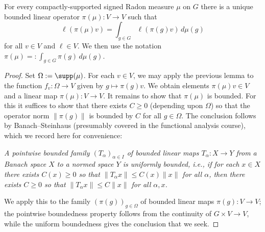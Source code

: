\documentclass[reqno]{amsart} 
\begin{document}
\begin{lemma}
  For every compactly-supported signed Radon measure $\mu$ on $G$ there is a unique bounded linear operator $\pi(\mu) : V \rightarrow V$ such that
  \begin{equation}\label{eq:}
    \ell(\pi(\mu) v)
    = \int_{g \in G} \ell(\pi(g) v) \, d \mu(g)
  \end{equation}
  for all $v \in V$ and $\ell \in V$.  We then use the notation $\pi(\mu) =: \int_{g \in G} \pi(g) \, d \mu(g)$.
\end{lemma}
\begin{proof}
  Set $\Omega := \supp(\mu)$.  For each $v \in V$, we may apply the previous lemma to the function $f_v : \Omega \rightarrow V$ given by $g \mapsto \pi(g) v$.  We obtain elements $\pi(\mu) v \in V$ and a linear map $\pi(\mu) : V \rightarrow V$.  It remains to show that $\pi(\mu)$ is bounded.  For this it suffices to show that there exists $C \geq 0$ (depending upon $\Omega$) so that the operator norm $\|\pi(g)\|$ is bounded by $C$ for all $g \in \Omega$.  The conclusion follows by Banach--Steinhaus (presumably covered in the functional analysis course), which we record here for convenience:
  \begin{center}
    \emph{A pointwise bounded family $(T_\alpha)_{\alpha \in I}$ of bounded linear maps $T_\alpha : X \rightarrow Y$ from a Banach space $X$ to a normed space $Y$ is uniformly bounded, i.e., if for each $x \in X$ there exists $C(x) \geq 0$ so that $\|T_\alpha x\| \leq C(x) \|x\|$ for all $\alpha$, then there exists $C \geq 0$ so that $\|T_\alpha x\| \leq C \|x\|$ for all $\alpha,x$.}
  \end{center}
  We apply this to the family $(\pi(g))_{g \in \Omega}$ of bounded linear maps $\pi(g) : V \rightarrow V$; the pointwise boundedness property follows from the continuity of $G \times V \rightarrow V$, while the uniform boundedness gives the conclusion that we seek.


\end{proof}
\end{document}
